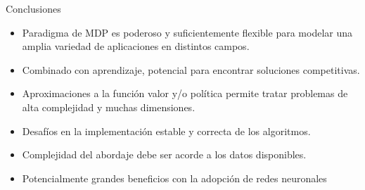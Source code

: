 \documentclass[xcolor=dvipsnames, handout]{beamer}
\begin{document}
\begin{frame}{Conclusiones}
\begin{itemize}
\item Paradigma de MDP es poderoso y suficientemente flexible para modelar una amplia variedad de aplicaciones en distintos campos.
\item<2-> Combinado con aprendizaje, potencial para encontrar soluciones competitivas.
\item<3-> Aproximaciones a la función valor y/o política permite tratar problemas de alta complejidad y muchas dimensiones.
\item<4-> Desafíos en la implementación estable y correcta de los algoritmos.
\item<5-> Complejidad del abordaje debe ser acorde a los datos disponibles.
\item<6-> Potencialmente grandes beneficios con la adopción de redes neuronales
\end{itemize}
\end{frame}
\end{document}
